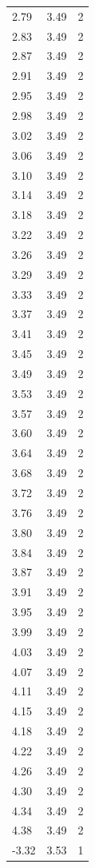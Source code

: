 \begin{longtable}{lrr}
  2.79 & 3.49 & 2 \\
  2.83 & 3.49 & 2 \\
  2.87 & 3.49 & 2 \\
  2.91 & 3.49 & 2 \\
  2.95 & 3.49 & 2 \\
  2.98 & 3.49 & 2 \\
  3.02 & 3.49 & 2 \\
  3.06 & 3.49 & 2 \\
  3.10 & 3.49 & 2 \\
  3.14 & 3.49 & 2 \\
  3.18 & 3.49 & 2 \\
  3.22 & 3.49 & 2 \\
  3.26 & 3.49 & 2 \\
  3.29 & 3.49 & 2 \\
  3.33 & 3.49 & 2 \\
  3.37 & 3.49 & 2 \\
  3.41 & 3.49 & 2 \\
  3.45 & 3.49 & 2 \\
  3.49 & 3.49 & 2 \\
  3.53 & 3.49 & 2 \\
  3.57 & 3.49 & 2 \\
  3.60 & 3.49 & 2 \\
  3.64 & 3.49 & 2 \\
  3.68 & 3.49 & 2 \\
  3.72 & 3.49 & 2 \\
  3.76 & 3.49 & 2 \\
  3.80 & 3.49 & 2 \\
  3.84 & 3.49 & 2 \\
  3.87 & 3.49 & 2 \\
  3.91 & 3.49 & 2 \\
  3.95 & 3.49 & 2 \\
  3.99 & 3.49 & 2 \\
  4.03 & 3.49 & 2 \\
  4.07 & 3.49 & 2 \\
  4.11 & 3.49 & 2 \\
  4.15 & 3.49 & 2 \\
  4.18 & 3.49 & 2 \\
  4.22 & 3.49 & 2 \\
  4.26 & 3.49 & 2 \\
  4.30 & 3.49 & 2 \\
  4.34 & 3.49 & 2 \\
  4.38 & 3.49 & 2 \\
  -3.32 & 3.53 & 1 \\

\end{longtable}
